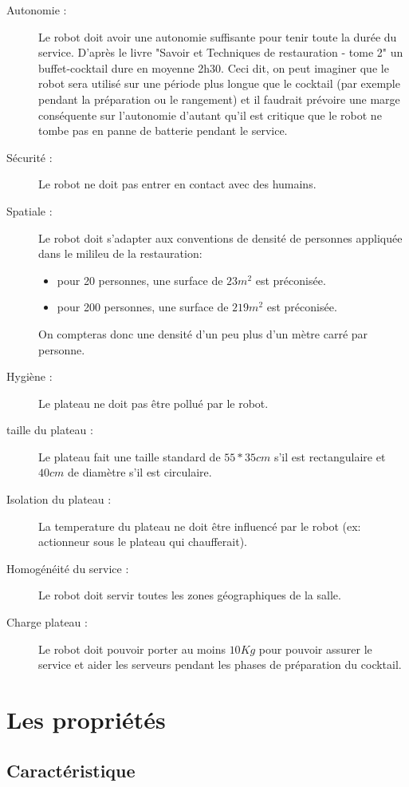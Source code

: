 \begin{description}
\item[Autonomie :] Le robot doit avoir une autonomie suffisante pour
  tenir toute la durée du service. D'après le livre "Savoir et
  Techniques de restauration - tome 2" un buffet-cocktail dure en
  moyenne 2h30. Ceci dit, on peut imaginer que le robot sera utilisé
  sur une période plus longue que le cocktail (par exemple pendant la
  préparation ou le rangement) et il faudrait prévoire une marge
  conséquente sur l'autonomie d'autant qu'il est critique que le robot
  ne tombe pas en panne de batterie pendant le service.
\item[Sécurité :] Le robot ne doit pas entrer en contact avec des humains.
\item[Spatiale :] Le robot doit s'adapter aux conventions de densité
  de personnes appliquée dans le milileu de la restauration:
  \begin{itemize}
  \item pour 20 personnes, une surface de $23m^2$ est préconisée.
  \item pour 200 personnes, une surface de $219m^2$ est préconisée.
  \end{itemize}
  On compteras donc une densité d'un peu plus d'un mètre carré par
  personne.
\item[Hygiène :] Le plateau ne doit pas être pollué par le robot.
\item[taille du plateau :] Le plateau fait une taille standard de
  $55*35cm$ s'il est rectangulaire et $40cm$ de diamètre s'il est
  circulaire.
\item[Isolation du plateau :] La temperature du plateau ne doit être
  influencé par le robot (ex: actionneur sous le plateau qui
  chaufferait).
\item[Homogénéité du service :] Le robot doit servir toutes les zones
  géographiques de la salle.
\item[Charge plateau :] Le robot doit pouvoir porter au moins $10Kg$
  pour pouvoir assurer le service et aider les serveurs pendant les
  phases de préparation du cocktail.
\end{description}



\section{Les propriétés}
\subsection{Caractéristique}
